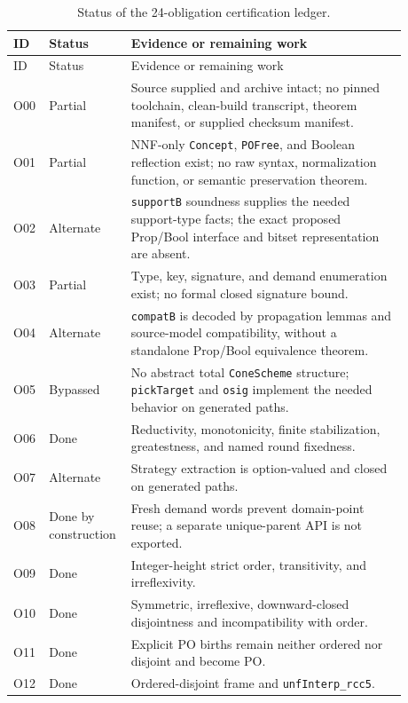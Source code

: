 \documentclass[11pt]{article}
\newcommand{\code}[1]{\texttt{#1}}
\begin{document}
\begin{longtable}{>{\raggedright\arraybackslash}p{0.07\linewidth}
                  >{\raggedright\arraybackslash}p{0.14\linewidth}
                  >{\raggedright\arraybackslash}p{0.67\linewidth}}
\caption{Status of the 24-obligation certification ledger.}\label{tab:ledger}\\
\toprule
ID & Status & Evidence or remaining work \\
\midrule
\endfirsthead
\toprule
ID & Status & Evidence or remaining work \\
\midrule
\endhead
O00 & Partial & Source supplied and archive intact; no pinned toolchain, clean-build
transcript, theorem manifest, or supplied checksum manifest. \\
O01 & Partial & NNF-only \code{Concept}, \code{POFree}, and Boolean reflection exist;
no raw syntax, normalization function, or semantic preservation theorem. \\
O02 & Alternate & \code{supportB} soundness supplies the needed support-type facts;
the exact proposed Prop/Bool interface and bitset representation are absent. \\
O03 & Partial & Type, key, signature, and demand enumeration exist; no formal closed
signature bound. \\
O04 & Alternate & \code{compatB} is decoded by propagation lemmas and source-model
compatibility, without a standalone Prop/Bool equivalence theorem. \\
O05 & Bypassed & No abstract total \code{ConeScheme} structure; \code{pickTarget} and
\code{osig} implement the needed behavior on generated paths. \\
O06 & Done & Reductivity, monotonicity, finite stabilization, greatestness, and named
round fixedness. \\
O07 & Alternate & Strategy extraction is option-valued and closed on generated paths. \\
O08 & Done by construction & Fresh demand words prevent domain-point reuse; a separate
unique-parent API is not exported. \\
O09 & Done & Integer-height strict order, transitivity, and irreflexivity. \\
O10 & Done & Symmetric, irreflexive, downward-closed disjointness and incompatibility
with order. \\
O11 & Done & Explicit PO births remain neither ordered nor disjoint and become PO. \\
O12 & Done & Ordered-disjoint frame and \code{unfInterp\_rcc5}. \\

\end{longtable}
\end{document}
